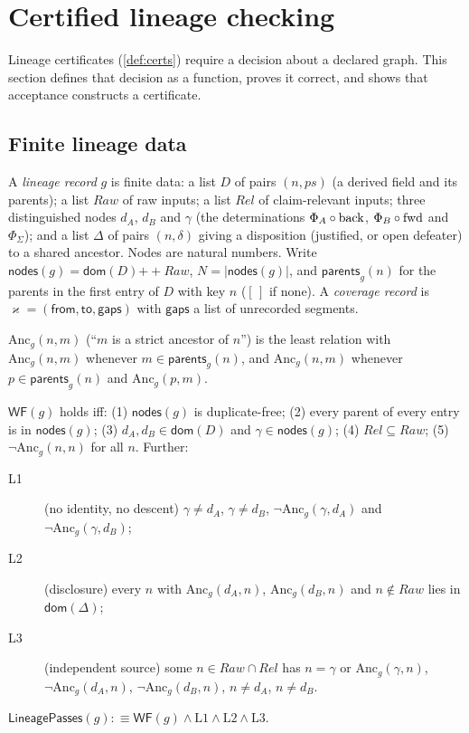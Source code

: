 \section{Certified lineage checking}\label{sec:lineage}

Lineage certificates (\cref{def:certs}) require a decision about a declared graph. This section defines that decision as a function, proves it correct, and shows that acceptance constructs a certificate.

\subsection{Finite lineage data}
\begin{defi}\label{def:lineage}
A \emph{lineage record} $g$ is finite data: a list $D$ of pairs $(n,\mathit{ps})$ (a derived field and its parents); a list $\mathit{Raw}$ of raw inputs; a list $\mathit{Rel}$ of claim-relevant inputs; three distinguished nodes $d_A$, $d_B$ and $\gamma$ (the determinations $\Phi_A\circ\mathrm{back}$, $\Phi_B\circ\mathrm{fwd}$ and $\Phi_\Sigma$); and a list $\Delta$ of pairs $(n,\delta)$ giving a disposition (justified, or open defeater) to a shared ancestor. Nodes are natural numbers. Write $\mathsf{nodes}(g) = \mathsf{dom}(D) \mathbin{+\!\!+} \mathit{Raw}$, $N = |\mathsf{nodes}(g)|$, and $\mathsf{parents}_g(n)$ for the parents in the first entry of $D$ with key $n$ ($[\,]$ if none). A \emph{coverage record} is $\varkappa = (\mathsf{from},\mathsf{to},\mathsf{gaps})$ with $\mathsf{gaps}$ a list of unrecorded segments.
\end{defi}
$\mathrm{Anc}_g(n,m)$ (``$m$ is a strict ancestor of $n$'') is the least relation with $\mathrm{Anc}_g(n,m)$ whenever $m \in \mathsf{parents}_g(n)$, and $\mathrm{Anc}_g(n,m)$ whenever $p \in \mathsf{parents}_g(n)$ and $\mathrm{Anc}_g(p,m)$.

\begin{defi}\label{def:L}
$\mathsf{WF}(g)$ holds iff: (1) $\mathsf{nodes}(g)$ is duplicate-free; (2) every parent of every entry is in $\mathsf{nodes}(g)$; (3) $d_A,d_B \in \mathsf{dom}(D)$ and $\gamma \in \mathsf{nodes}(g)$; (4) $\mathit{Rel} \subseteq \mathit{Raw}$; (5) $\neg\mathrm{Anc}_g(n,n)$ for all $n$. Further:
\begin{description}
\item[L1] (no identity, no descent) $\gamma \neq d_A$, $\gamma \neq d_B$, $\neg\mathrm{Anc}_g(\gamma,d_A)$ and $\neg\mathrm{Anc}_g(\gamma,d_B)$;
\item[L2] (disclosure) every $n$ with $\mathrm{Anc}_g(d_A,n)$, $\mathrm{Anc}_g(d_B,n)$ and $n \notin \mathit{Raw}$ lies in $\mathsf{dom}(\Delta)$;
\item[L3] (independent source) some $n \in \mathit{Raw} \cap \mathit{Rel}$ has $n = \gamma$ or $\mathrm{Anc}_g(\gamma,n)$, $\neg\mathrm{Anc}_g(d_A,n)$, $\neg\mathrm{Anc}_g(d_B,n)$, $n \neq d_A$, $n \neq d_B$.
\end{description}
$\mathsf{LineagePasses}(g) :\equiv \mathsf{WF}(g) \wedge \mathrm{L1} \wedge \mathrm{L2} \wedge \mathrm{L3}$.
\end{defi}

